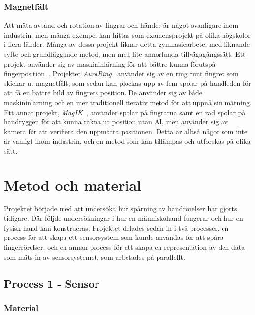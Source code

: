 \documentclass[a4paper]{article}
\begin{document}
\begin{sloppypar}
  \subsubsection{Magnetfält}
  Att mäta avtånd och rotation av fingrar och händer är något ovanligare inom industrin, men många exempel kan hittas som examensprojekt på olika högskolor i flera länder.
  Många av dessa projekt liknar detta gymnasiearbete, med liknande syfte och grundläggande metod, men med lite annorlunda tillvägagångssätt.
  Ett projekt använder sig av maskininlärning för att bättre kunna förutspå fingerposition~\cite{article:sci-rep-mag-ind}.
  Projektet \textit{AuraRing}~\cite{article:AuraRing} använder sig av en ring runt fingret som skickar ut magnetfält, som sedan kan plockas upp av fem spolar på handleden för att få en bättre bild av fingrets position.
  De använder sig av både maskininlärning och en mer traditionell iterativ metod för att uppnå sin mätning.
  Ett annat projekt, \textit{MagIK}~\cite{article:MagIK}, använder spolar på fingrarna samt en rad spolar på handryggen för att kunna räkna ut position utan AI, men använder sig av kamera för att verifiera den uppmätta positionen.
  Detta är alltså något som inte är vanligt inom industrin, och en metod som kan tillämpas och utforskas på olika sätt.

  \section{Metod och material}


  Projektet började med att undersöka hur spårning av handrörelser har gjorts tidigare.
  Där följde undersökningar i hur en människohand fungerar och hur en fysisk hand kan konstrueras.
  Projektet delades sedan in i två processer, en process för att skapa ett sensorsystem som kunde användas för att spåra fingerrörelser,
  och en annan process för att skapa en representation av den data som mäts in av sensorsystemet, som arbetades på parallellt.

  \subsection{Process 1 - Sensor}

  \subsubsection{Material}


\end{sloppypar}
\end{document}

